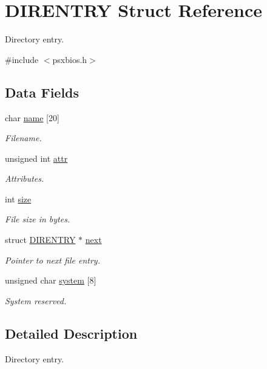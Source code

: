 \hypertarget{structDIRENTRY}{}\section{D\+I\+R\+E\+N\+T\+RY Struct Reference}
\label{structDIRENTRY}


Directory entry.  




{\ttfamily \#include $<$psxbios.\+h$>$}

\subsection*{Data Fields}
\begin{DoxyCompactItemize}
\item 
char \hyperlink{structDIRENTRY_a399cf9bfdcc24e250a0276eea0ae95c0}{name} \mbox{[}20\mbox{]}
\begin{DoxyCompactList}\small\item\em Filename. \end{DoxyCompactList}\item 
unsigned int \hyperlink{structDIRENTRY_a3a69fa9a11d915150af5a10047f593da}{attr}
\begin{DoxyCompactList}\small\item\em Attributes. \end{DoxyCompactList}\item 
int \hyperlink{structDIRENTRY_a5c334817f6e1341cd2c0e69a3eea867b}{size}
\begin{DoxyCompactList}\small\item\em File size in bytes. \end{DoxyCompactList}\item 
struct \hyperlink{structDIRENTRY}{D\+I\+R\+E\+N\+T\+RY} $\ast$ \hyperlink{structDIRENTRY_aa137960e22f2663b42d51cb6979f3ac3}{next}
\begin{DoxyCompactList}\small\item\em Pointer to next file entry. \end{DoxyCompactList}\item 
unsigned char \hyperlink{structDIRENTRY_af4a5a4c764708f42c4f4396705e0b461}{system} \mbox{[}8\mbox{]}
\begin{DoxyCompactList}\small\item\em System reserved. \end{DoxyCompactList}\end{DoxyCompactItemize}


\subsection{Detailed Description}
Directory entry. 

